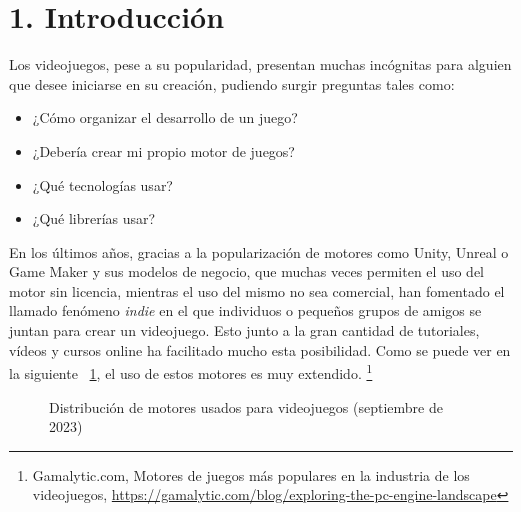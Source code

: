 \chapter*{1. Introducción}\label{cap:intro}

Los videojuegos, pese a su popularidad, presentan muchas incógnitas para alguien que desee iniciarse en su creación, 
pudiendo surgir preguntas tales como:
\begin{itemize}
    \item ¿Cómo organizar el desarrollo de un juego?
    \item ¿Debería crear mi propio motor de juegos?
    \item ¿Qué tecnologías usar?
    \item ¿Qué librerías usar?
\end{itemize}
En los últimos años, gracias a la popularización de motores como Unity\cite{unity}, Unreal\cite{unreal} o
Game Maker\cite{gamemaker} y sus modelos de negocio, que muchas veces permiten el uso del motor sin licencia, mientras el uso
del mismo no sea comercial\cite{unity-pricing}\cite{unreal-pricing}\cite{gamemaker-pricing}, han fomentado el llamado fenómeno \textit{indie} en el que individuos o pequeños grupos de
amigos se juntan para crear un videojuego. Esto junto a la gran cantidad de tutoriales, vídeos y cursos online
ha facilitado mucho esta posibilidad. Como se puede ver en la siguiente \figurename~\ref{engine_distribution}, el uso de estos motores es muy extendido. 
\footnote{Gamalytic.com, Motores de juegos más populares en la industria de los videojuegos, \url{https://gamalytic.com/blog/exploring-the-pc-engine-landscape}}

\begin{figure}[h!]
    \centering
    
    
    \caption{Distribución de motores usados para videojuegos (septiembre de 2023)}
    \label{engine_distribution}
\end{figure}


